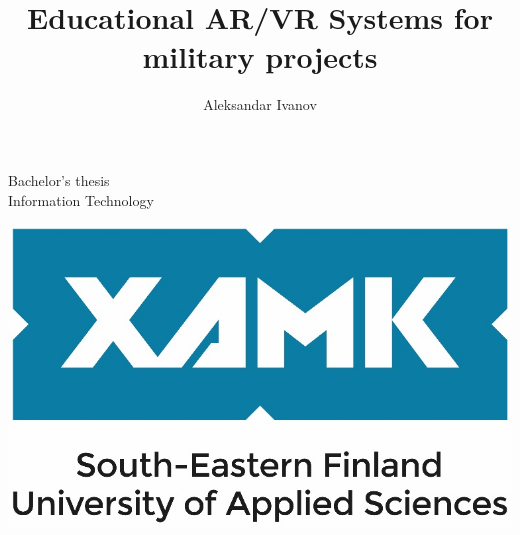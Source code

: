 \documentclass[12pt, a4paper,oneside, nocenter]{thesis}
\author{Aleksandar Ivanov}
\title{Educational AR/VR Systems for military projects}
\begin{document}

\makeatletter
\begin{titlepage}
	\begin{center}
		\vspace*{2cm}
		{\fontsize{16}{16}{\selectfont\@author}}\par
		\vspace{1cm}
		
		{ 
			\fontsize{24}{24}{\selectfont\MakeUppercase{\@title}}
			
		}
		
		\vspace{1.5cm}
		{
			\fontsize{16}{16}\selectfont Bachelor's thesis \\ Information Technology
			
		}
        	
		\vspace{1.5cm}
        
		\fontsize{16}{16}\selectfont\the\year
        
		\vfill
		\includegraphics{xamklogo}
		\vspace{0.8cm}
	\end{center}
\end{titlepage}
\makeatother
{}%
\end{document}

